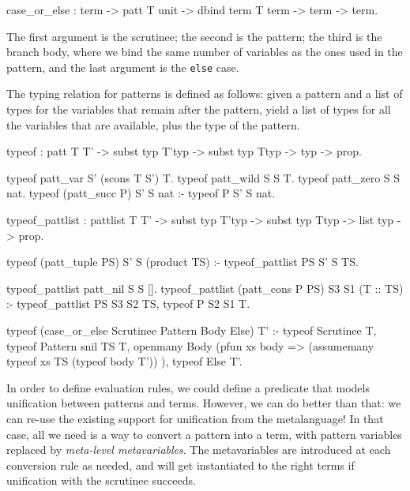 \documentclass[format=acmlarge,review,anonymous]{acmart}\settopmatter{printfolios=true}
\begin{document}
\begin{codequote}
case_or_else : term -> patt T unit -> dbind term T term -> term -> term.
\end{codequote}

The first argument is the scrutinee; the second is the pattern; the third is the branch body, where
we bind the same number of variables as the ones used in the pattern, and the last argument is the
\texttt{else} case.

The typing relation for patterns is defined as follows: given a pattern and a list of types for the
variables that remain after the pattern, yield a list of types for all the variables that are
available, plus the type of the pattern.

\begin{codequote}
typeof : patt T T' -> subst typ T'typ -> subst typ Ttyp -> typ -> prop.

typeof patt_var S' (scons T S') T.
typeof patt_wild S S T.
typeof patt_zero S S nat.
typeof (patt_succ P) S' S nat :-
  typeof P S' S nat.

typeof_pattlist : pattlist T T' -> subst typ T'typ -> subst typ Ttyp -> list typ -> prop.

typeof (patt_tuple PS) S' S (product TS) :-
  typeof_pattlist PS S' S TS.

typeof_pattlist patt_nil S S [].
typeof_pattlist (patt_cons P PS) S3 S1 (T :: TS) :-
  typeof_pattlist PS S3 S2 TS, typeof P S2 S1 T.

typeof (case_or_else Scrutinee Pattern Body Else) T' :-
  typeof Scrutinee T,
  typeof Pattern snil TS T,
  openmany Body (pfun xs body =>
     (assumemany typeof xs TS (typeof body T'))
  ),
  typeof Else T'.
\end{codequote}

In order to define evaluation rules, we could define a predicate that models unification between
patterns and terms. However, we can do better than that: we can re-use the existing support for
unification from the metalanguage! In that case, all we need is a way to convert a pattern into a
term, with pattern variables replaced by \emph{meta-level metavariables}. The metavariables are
introduced at each conversion rule as needed, and will get instantiated to the right terms if
unification with the scrutinee succeeds.
\end{document}
